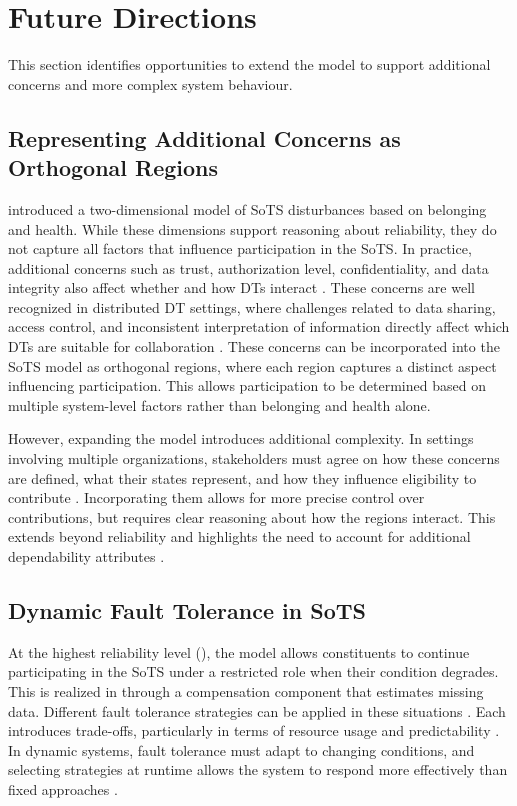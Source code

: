 \section{Future Directions}\label{sec:discussion-future}
This section identifies opportunities to extend the model to support additional concerns and more complex system behaviour.


\subsection{Representing Additional Concerns as Orthogonal Regions}
 introduced a two-dimensional model of SoTS disturbances based on belonging and health. While these dimensions support reasoning about reliability, they do not capture all factors that influence participation in the SoTS. In practice, additional concerns such as trust, authorization level, confidentiality, and data integrity also affect whether and how DTs interact \cite{li2023trust, kuruppuarachchi2023trusted}. These concerns are well recognized in distributed DT settings, where challenges related to data sharing, access control, and inconsistent interpretation of information directly affect which DTs are suitable for collaboration \cite{tripathi2024stakeholders}. These concerns can be incorporated into the SoTS model as orthogonal regions, where each region captures a distinct aspect influencing participation. This allows participation to be determined based on multiple system-level factors rather than belonging and health alone.

However, expanding the model introduces additional complexity. In settings involving multiple organizations, stakeholders must agree on how these concerns are defined, what their states represent, and how they influence eligibility to contribute \cite{carney2005topics}. Incorporating them allows for more precise control over contributions, but requires clear reasoning about how the regions interact. This extends beyond reliability and highlights the need to account for additional dependability attributes \cite{avizienis2004basic}.


\subsection{Dynamic Fault Tolerance in SoTS}
At the highest reliability level (), the model allows constituents to continue participating in the SoTS under a restricted role when their condition degrades. This is realized in  through a compensation component that estimates missing data. Different fault tolerance strategies can be applied in these situations \cite{hanmer2013patterns}. Each introduces trade-offs, particularly in terms of resource usage and predictability \cite{narasimhan2002trade}. In dynamic systems, fault tolerance must adapt to changing conditions, and selecting strategies at runtime allows the system to respond more effectively than fixed approaches \cite{de2022systematic, ballesteros2022infrastructure}.


